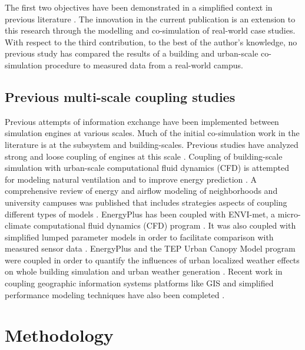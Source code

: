 \documentclass{tBPS2e}
\theoremstyle{plain}
\theoremstyle{definition}
\theoremstyle{remark}
\begin{document}
The first two objectives have been demonstrated in a simplified context in previous literature \citep{thomas2014multiscale,Miller:2015vk}. The innovation in the current publication is an extension to this research through the modelling and co-simulation of real-world case studies. With respect to the third contribution, to the best of the author's knowledge, no previous study has compared the results of a building and urban-scale co-simulation procedure to measured data from a real-world campus. 

\subsection{Previous multi-scale coupling studies}
Previous attempts of information exchange have been implemented between simulation engines at various scales. Much of the initial co-simulation work in the literature is at the subsystem and building-scales. Previous studies have analyzed strong and loose coupling of engines at this scale \citep{Trcka:2010cr,Wetter:2011kh}. Coupling of building-scale simulation with urban-scale computational fluid dynamics (CFD) is attempted for modeling natural ventilation \citep{Zhang:2013vx} and to improve energy prediction \citep{Bouyer:2011eha}. A comprehensive review of energy and airflow modeling of neighborhoods and university campuses was published that includes strategies aspects of coupling different types of models \citep{Srebric:2015gq}. EnergyPlus has been coupled with ENVI-met, a micro-climate computational fluid dynamics (CFD) program \citep{Yang:2012cr}. It was also coupled with simplified lumped parameter models in order to facilitate comparison with measured sensor data \citep{Martin:2015fj}. EnergyPlus and the TEP Urban Canopy Model program were coupled in order to quantify the influences of urban localized weather effects on whole building simulation \citep{Bueno:2011hi} and urban weather generation \citep{Bueno:2013hh}. Recent work in coupling geographic information systems platforms like GIS and simplified performance modeling techniques have also been completed \citep{Fonseca:2015bm}.

\section{Methodology}\label{Methodology}
\end{document}
